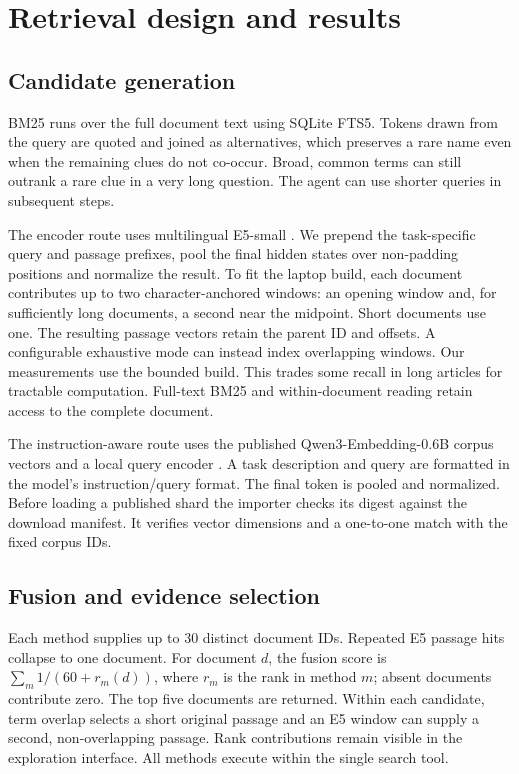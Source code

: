 \documentclass[sigconf]{acmart}
\begin{document}
\section{Retrieval design and results}
\subsection{Candidate generation}
BM25 runs over the full document text using SQLite FTS5. Tokens drawn from the query are quoted and joined as alternatives, which preserves a rare name even when the remaining clues do not co-occur. Broad, common terms can still outrank a rare clue in a very long question. The agent can use shorter queries in subsequent steps.

The encoder route uses multilingual E5-small \cite{e5}. We prepend the task-specific query and passage prefixes, pool the final hidden states over non-padding positions and normalize the result. To fit the laptop build, each document contributes up to two character-anchored windows: an opening window and, for sufficiently long documents, a second near the midpoint. Short documents use one. The resulting \ECount{} passage vectors retain the parent ID and offsets. A configurable exhaustive mode can instead index overlapping windows. Our measurements use the bounded build. This trades some recall in long articles for tractable computation. Full-text BM25 and within-document reading retain access to the complete document.

The instruction-aware route uses the published Qwen3-Embedding-0.6B corpus vectors and a local query encoder \cite{qwen}. A task description and query are formatted in the model's instruction/query format. The final token is pooled and normalized. Before loading a published shard the importer checks its digest against the download manifest. It verifies vector dimensions and a one-to-one match with the fixed corpus IDs.

\subsection{Fusion and evidence selection}
Each method supplies up to 30 distinct document IDs. Repeated E5 passage hits collapse to one document. For document \(d\), the fusion score is \(\sum_m 1/(60+r_m(d))\), where \(r_m\) is the rank in method \(m\); absent documents contribute zero. The top five documents are returned. Within each candidate, term overlap selects a short original passage and an E5 window can supply a second, non-overlapping passage. Rank contributions remain visible in the exploration interface. All methods execute within the single search tool.
\end{document}
